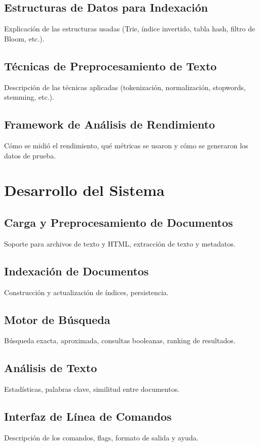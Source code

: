 \documentclass[9pt,letterpaper,onecolumn]{rho-class/rho}
\begin{document}
\subsection{Estructuras de Datos para Indexación}
Explicación de las estructuras usadas (Trie, índice invertido, tabla hash, filtro de Bloom, etc.).

\subsection{Técnicas de Preprocesamiento de Texto}
Descripción de las técnicas aplicadas (tokenización, normalización, stopwords, stemming, etc.).

\subsection{Framework de Análisis de Rendimiento}
Cómo se midió el rendimiento, qué métricas se usaron y cómo se generaron los datos de prueba.

\section{Desarrollo del Sistema}
\subsection{Carga y Preprocesamiento de Documentos}
Soporte para archivos de texto y HTML, extracción de texto y metadatos.

\subsection{Indexación de Documentos}
Construcción y actualización de índices, persistencia.

\subsection{Motor de Búsqueda}
Búsqueda exacta, aproximada, consultas booleanas, ranking de resultados.

\subsection{Análisis de Texto}
Estadísticas, palabras clave, similitud entre documentos.

\subsection{Interfaz de Línea de Comandos}
Descripción de los comandos, flags, formato de salida y ayuda.
\end{document}
